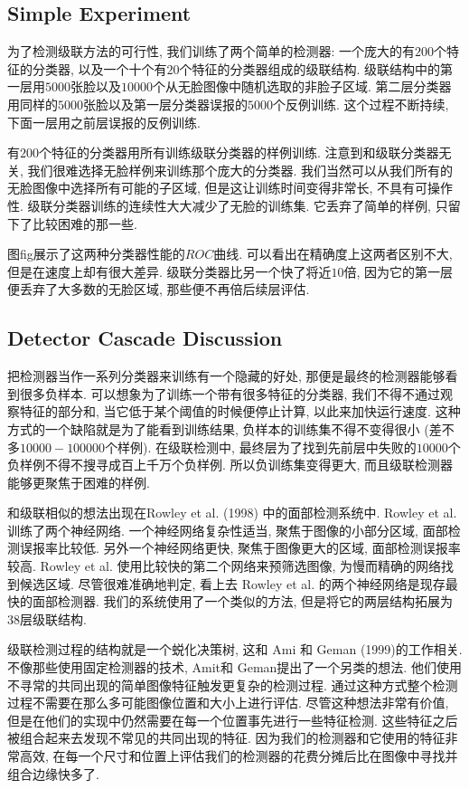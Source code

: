\documentclass[utf8]{ctexart}
\begin{document}
\subsection{Simple Experiment}
为了检测级联方法的可行性, 我们训练了两个简单的检测器: 一个庞大的有$200$个特征的分类器, 以及一个十个有$20$个特征的分类器组成的级联结构. 级联结构中的第一层用$5000$张脸以及$10000$个从无脸图像中随机选取的非脸子区域.
第二层分类器用同样的$5000$张脸以及第一层分类器误报的$5000$个反例训练. 这个过程不断持续, 下面一层用之前层误报的反例训练.

有$200$个特征的分类器用所有训练级联分类器的样例训练. 注意到和级联分类器无关, 我们很难选择无脸样例来训练那个庞大的分类器. 我们当然可以从我们所有的无脸图像中选择所有可能的子区域, 但是这让训练时间变得非常长, 不具有可操作性. 级联分类器训练的连续性大大减少了无脸的训练集. 它丢弃了简单的样例, 只留下了比较困难的那一些.

图fig展示了这两种分类器性能的$ROC$曲线. 可以看出在精确度上这两者区别不大, 但是在速度上却有很大差异. 级联分类器比另一个快了将近$10$倍, 因为它的第一层便丢弃了大多数的无脸区域, 那些便不再倍后续层评估.

\subsection{Detector Cascade Discussion}
把检测器当作一系列分类器来训练有一个隐藏的好处, 那便是最终的检测器能够看到很多负样本. 可以想象为了训练一个带有很多特征的分类器, 我们不得不通过观察特征的部分和, 当它低于某个阈值的时候便停止计算, 以此来加快运行速度. 这种方式的一个缺陷就是为了能看到训练结果, 负样本的训练集不得不变得很小 (差不多$10000-100000$个样例).
在级联检测中, 最终层为了找到先前层中失败的$10000$个负样例不得不搜寻成百上千万个负样例. 所以负训练集变得更大, 而且级联检测器能够更聚焦于困难的样例.

和级联相似的想法出现在Rowley et al. (1998) 中的面部检测系统中. Rowley et al. 训练了两个神经网络. 一个神经网络复杂性适当, 聚焦于图像的小部分区域, 面部检测误报率比较低. 另外一个神经网络更快, 聚焦于图像更大的区域, 面部检测误报率较高. Rowley et al. 使用比较快的第二个网络来预筛选图像, 为慢而精确的网络找到候选区域.
尽管很难准确地判定, 看上去 Rowley et al. 的两个神经网络是现存最快的面部检测器. 我们的系统使用了一个类似的方法, 但是将它的两层结构拓展为$38$层级联结构.

级联检测过程的结构就是一个蜕化决策树, 这和 Ami 和 Geman (1999)的工作相关. 不像那些使用固定检测器的技术, Amit和 Geman提出了一个另类的想法. 他们使用不寻常的共同出现的简单图像特征触发更复杂的检测过程.
通过这种方式整个检测过程不需要在那么多可能图像位置和大小上进行评估. 尽管这种想法非常有价值, 但是在他们的实现中仍然需要在每一个位置事先进行一些特征检测. 这些特征之后被组合起来去发现不常见的共同出现的特征. 因为我们的检测器和它使用的特征非常高效, 在每一个尺寸和位置上评估我们的检测器的花费分摊后比在图像中寻找并组合边缘快多了.
\end{document}

